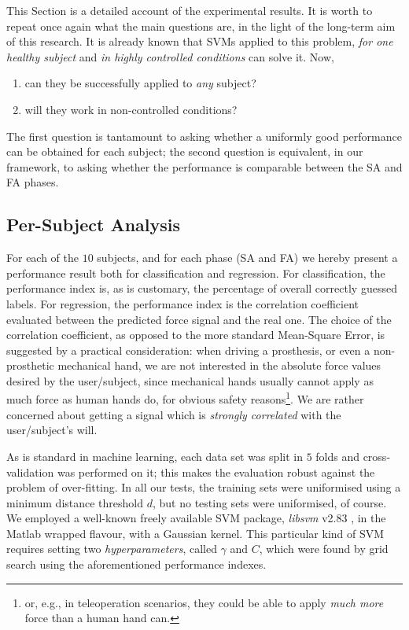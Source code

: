 This Section is a detailed account of the experimental results. It is
worth to repeat once again what the main questions are, in the light
of the long-term aim of this research. It is already known that SVMs
applied to this problem, \emph{for one healthy subject} and \emph{in
highly controlled conditions} can solve it. Now,

\begin{enumerate}

  \item can they be successfully applied to \emph{any} subject?

  \item will they work in non-controlled conditions?

\end{enumerate}

The first question is tantamount to asking whether a uniformly good
performance can be obtained for each subject; the second question is
equivalent, in our framework, to asking whether the performance is
comparable between the SA and FA phases.

\subsection{Per-Subject Analysis}

For each of the $10$ subjects, and for each phase (SA and FA) we
hereby present a performance result both for classification and
regression. For classification, the performance index is, as is
customary, the percentage of overall correctly guessed labels. For
regression, the performance index is the correlation coefficient
evaluated between the predicted force signal and the real one. The
choice of the correlation coefficient, as opposed to the more standard
Mean-Square Error, is suggested by a practical consideration: when
driving a prosthesis, or even a non-prosthetic mechanical hand, we are
not interested in the absolute force values desired by the
user/subject, since mechanical hands usually cannot apply as much
force as human hands do, for obvious safety reasons\footnote{or, e.g.,
in teleoperation scenarios, they could be able to apply \emph{much
more} force than a human hand can.}. We are rather concerned about
getting a signal which is \emph{strongly correlated} with the
user/subject's will.

As is standard in machine learning, each data set was split in $5$
folds and cross-validation was performed on it; this makes the
evaluation robust against the problem of over-fitting. In all our
tests, the training sets were uniformised using a minimum distance
threshold $d$, but no testing sets were uniformised, of course. We
employed a well-known freely available SVM package, \emph{libsvm}
v2.83 \cite{ChangL01}, in the Matlab wrapped flavour, with a Gaussian
kernel. This particular kind of SVM requires setting two
\emph{hyperparameters}, called $\gamma$ and $C$, which were found by
grid search using the aforementioned performance indexes.

